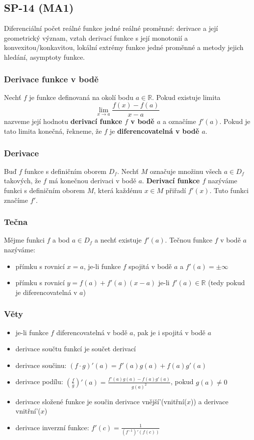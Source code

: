 \subsection{SP-14 (MA1)}
Diferenciální počet reálné funkce jedné reálné proměnné: derivace a její geometrický význam, vztah derivací funkce s její monotonií a konvexitou/konkavitou, lokální extrémy funkce jedné proměnné a metody jejich hledání, asymptoty funkce.

\subsubsection*{Derivace funkce v bodě}
Nechť $f$ je funkce definovaná na okolí bodu $a \in \mathbb{R}$. Pokud existuje limita $$\lim_{x\to a} \frac{f(x) - f(a)}{x - a}$$
nazveme její hodnotu \textbf{derivací funkce $f$ v bodě $a$} a označíme $f'(a)$. Pokud je tato limita konečná, řekneme, že $f$ je \textbf{diferencovatelná v bodě $a$}.

\subsubsection*{Derivace}
Buď $f$ funkce s definičním oborem $D_f$. Nechť $M$ označuje množinu všech $a \in D_f$ takových, že $f$ má konečnou derivaci v bodě $a$. \textbf{Derivací funkce $f$} nazýváme funkci s definičním oborem $M$, která každému $x \in M$ přiřadí $f'(x)$. Tuto funkci značíme $f'$.

\subsubsection*{Tečna}
Mějme funkci $f$ a bod $a \in D_f$ a nechť existuje $f'(a)$. Tečnou funkce $f$ v bodě $a$ nazýváme:

\begin{itemize}
	\item přímku s rovnicí $x = a$, je-li funkce $f$ spojitá v bodě $a$ a $f'(a) = \pm \infty$
	\item přímku s rovnicí $y = f(a) + f'(a)(x-a)$ je-li $f'(a) \in \mathbb{R}$ (tedy pokud je diferencovatelná v $a$)
\end{itemize}

\subsubsection*{Věty}
\begin{itemize}
	\item je-li funkce $f$ diferencovatelná v bodě $a$, pak je i spojitá v bodě $a$
	\item derivace součtu funkcí je součet derivací
	\item derivace součinu: $(f \cdot g)'(a) = f'(a)g(a) + f(a)g'(a)$
	\item derivace podílu: $(\frac{f}{g})'(a) = \frac{f'(a)g(a) - f(a)g'(a)}{g(a)^2}$, pokud $g(a) \neq 0$
	\item derivace složené funkce je součin derivace vnější'(vnitřní($x$)) a derivace vnitřní'($x$)
	\item derivace inverzní funkce: $f'(c) = \frac{1}{(f^{-1})'(f(c))}$
\end{itemize}

